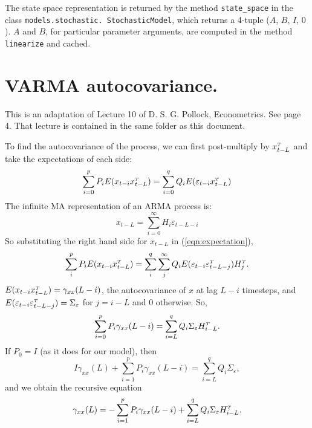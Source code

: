 \documentclass{article}
\begin{document}
The state space representation is returned by the method \texttt{state\_space} in the class \texttt{models.stochastic. StochasticModel}, which returns a 4-tuple ($A$, $B$, $I$, $0$). $A$ and $B$, for particular parameter arguments, are computed in the method \texttt{linearize} and cached.

\section{VARMA autocovariance.}
This is an adaptation of Lecture 10 of D. S. G. Pollock, Econometrics. See page 4. That lecture is contained in the same folder as this document.

To find the autocovariance of the process, we can first post-multiply by $x\trans _{t-L}$ and take the expectations of each side:
\begin{equation}
    \sum_{i=0}^p P_i E(x_{t-i} x\trans_{t-L}) = \sum_{i=0}^q Q_i E(\varepsilon_{t-i} x\trans_{t-L})
    \label{eqn:expectation}
\end{equation}
The infinite MA representation of an ARMA process is:
\begin{equation}
    x_{t-L} = \sum_{i=0}^{\infty} H_i \varepsilon_{t-L-i}
\end{equation}
So substituting the right hand side for $x_{t-L}$ in (\ref{eqn:expectation}),
\begin{equation}
    \sum_i^p P_i E(x_{t-i} x\trans_{t-L}) = \sum_i^q \sum_j^{\infty} Q_i E(\varepsilon_{t-i} \varepsilon\trans_{t-L-j}) H\trans_j.
\end{equation}
$E(x_{t-i}x\trans_{t-L}) = \gamma_{xx}(L-i)$, the autocovariance of $x$ at lag $L - i$ timesteps, and $E(\varepsilon_{t-i} \varepsilon\trans_{t-L-j}) = \Sigma_{\varepsilon}$ for $j = i-L$ and $0$ otherwise. So,
\begin{equation}
    \sum_{i=0}^p P_i \gamma_\xx(L-i) = \sum_{i=L}^q Q_i \Sigma_\varepsilon H\trans_{i-L}.
\end{equation}
If $P_0 = I$ (as it does for our model), then
\begin{equation}
    I\gamma_{xx}(L) + \sum^p_{i=1}P_i\gamma_{xx}(L-i)=\sum_{i=L}^q Q_i \Sigma_\varepsilon,
\end{equation}
and we obtain the recursive equation
\begin{equation}
    \gamma_\xx(L) = -\sum^p_{i=1} P_i \gamma_\xx(L-i) + \sum_{i=L}^q Q_i \Sigma_\varepsilon H\trans_{i-L}.
    \label{eqn:recursion}
\end{equation}
\end{document}
